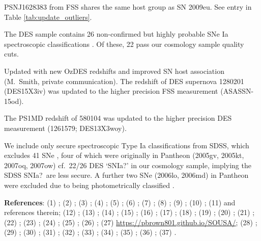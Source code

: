 \documentclass[
  journal=pasa,
  manuscript=research-paper,
  year=2022,
]{cup-journal}
\begin{document}
\begin{table}
\begin{threeparttable}[hbt!]
\begin{tablenotes}[flushleft]
\item [b] PSNJ1628383 from FSS shares the same host group as SN 2009eu. See entry in Table \ref{tab:update_outliers}.
\item [c] The DES sample contains 26 non-confirmed but highly probable SNe Ia spectroscopic classifications \citep[type `SNIa?' in Table 6 of][]{Smith2020}. Of these, 22 pass our cosmology sample quality cuts.
\item [d] Updated with new OzDES redshifts and improved SN host association (M.~Smith, private communication).  The redshift of DES supernova 1280201 (DES15X3iv) was updated to the higher precision FSS measurement (ASASSN-15od).
\item [e] The PS1MD redshift of 580104 was updated to the higher precision DES measurement (1261579; DES13X3woy).
\item [f] We include only secure spectroscopic Type Ia classifications from SDSS, which excludes 41 SNe \citep[type `SNIa?', in Table 2 of][]{Sako2018}, four of which were originally in Pantheon (2005gv, 2005kt, 2007oq, 2007ow) cf.~22/26 DES `SNIa?' in our cosmology sample, implying the SDSS SNIa?~are less secure. A further two SNe (2006lo, 2006md) in Pantheon were excluded due to being photometrically classified \citep[type `zSNIa' in][]{Sako2018}.
\item \textbf{References}: (1) \citet{Gilliland1998}; (2) \citet{Riess2001}; %
(3) \citet{Suzuki2012}; %
(4) \citet{Riess2018}; %
(5) \citet{Chen2020}; %
(6) \citet{Riess1999}; %
(7) \citet{Hamuy1996}; %
(8) \citet{Riess2004}; (9) \citet{Riess2007}; %
(10) \citet{Jha2006}; %
(11) \citet{Jha2007} and references therein; (12) \citet{Milne2010}; (13) \citet{Stritzinger2010}; (14) \citet{Tsvetkov2010}; (15) \citet{Zhang2010}; (16) \citet{Hsiao2015}; (17) \citet{Krisciunas2017_2005df}; (18) \citet{Burns2018}; (19) \citet{Contreras2010}; (20) \citet{Gall2018}; (21) \citet{Wee2018}; (22) \citet{Burns2020}; (23) \citet{Kawabata2020}; %
(24) \citet{Stahl2019}; %
(25) \citet{Hicken2012}; %
(26) \citet{Brown2014}; (27) \url{https://pbrown801.github.io/SOUSA/}; %
(28) \citet{Krisciunas2017}; %
(29) \citet{Ganeshalingam2010}; %
(30) \citet{Hicken2009}; %
(31) \citet{Guy2010}; %
(32) \citet{Foley2018}; %
(33) \citet{Scolnic2022samples}; %
(34) \citet{Brout2019}; (35) \citet{Smith2020}; %
(36) \citet{Scolnic2018}; %
(37) \citet{Sako2018}. %
\end{tablenotes}
\end{threeparttable}
\end{table}
\end{document}
